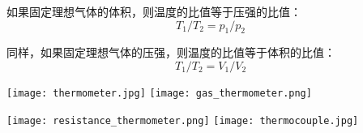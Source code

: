 \documentclass[CJK]{beamer}
\begin{document}
\begin{frame}
\bch
如果固定理想气体的体积，则温度的比值等于压强的比值：
$$T_1/T_2 = p_1/p_2$$

\skipline
同样，如果固定理想气体的压强，则温度的比值等于体积的比值：
$$T_1/T_2 = V_1/V_2$$


\ech
\end{frame}




\begin{frame}
\texttt{[image: thermometer.jpg]}
\hspace{0.2in}
\texttt{[image: gas\_thermometer.png]}

\texttt{[image: resistance\_thermometer.png]}
\hspace{0.2in}
\texttt{[image: thermocouple.jpg]}
\end{frame}
\end{document}
